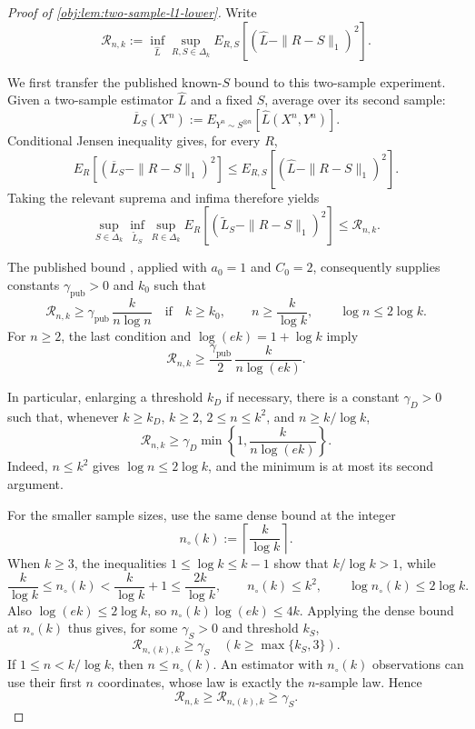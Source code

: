 \documentclass[11pt]{article}
\begin{document}
\begin{proof}[Proof of \cref{obj:lem:two-sample-l1-lower}]
Write
\[
\mathcal R_{n,k}:=
\inf_{\widehat L}\sup_{R,S\in\Delta_k}
E_{R,S}\!\left[(\widehat L-\|R-S\|_1)^2\right].
\] %

We first transfer the published known-\(S\) bound to this two-sample experiment. Given a two-sample estimator \(\widehat L\) and a fixed \(S\), average over its second sample:
\[
\overline L_S(X^n):=
E_{Y^n\sim S^{\otimes n}}\!\left[\widehat L(X^n,Y^n)\right].
\]
Conditional Jensen inequality gives, for every \(R\),
\[
E_R\!\left[(\overline L_S-\|R-S\|_1)^2\right]
\leq E_{R,S}\!\left[(\widehat L-\|R-S\|_1)^2\right].
\]
Taking the relevant suprema and infima therefore yields
\[
\sup_{S\in\Delta_k}\inf_{\widetilde L_S}\sup_{R\in\Delta_k}
E_R\!\left[(\widetilde L_S-\|R-S\|_1)^2\right]
\leq \mathcal R_{n,k}.
\] %

The published bound \citep[Theorem 3 and the unknown-both-distributions reduction following Theorem 6]{JiaoHanWeissman2018}, applied with \(a_0=1\) and \(C_0=2\), consequently supplies constants \(\gamma_{\mathrm{pub}}>0\) and \(k_0\) such that
\[
\mathcal R_{n,k}\geq \gamma_{\mathrm{pub}}\,\frac{k}{n\log n}
\quad\text{if}\quad
k\geq k_0,\qquad n\geq\frac{k}{\log k},
\qquad \log n\leq2\log k.
\]
For \(n\geq2\), the last condition and \(\log(ek)=1+\log k\) imply
\[
\mathcal R_{n,k}\geq
\frac{\gamma_{\mathrm{pub}}}{2}\,\frac{k}{n\log(ek)}.
\] %

In particular, enlarging a threshold \(k_D\) if necessary, there is a constant \(\gamma_D>0\) such that, whenever \(k\geq k_D\), \(k\geq2\), \(2\leq n\leq k^2\), and \(n\geq k/\log k\),
\[
\mathcal R_{n,k}\geq
\gamma_D\min\left\{1,\frac{k}{n\log(ek)}\right\}.
\]
Indeed, \(n\leq k^2\) gives \(\log n\leq2\log k\), and the minimum is at most its second argument. %

For the smaller sample sizes, use the same dense bound at the integer
\[
n_\circ(k):=\left\lceil\frac{k}{\log k}\right\rceil.
\]
When \(k\geq3\), the inequalities \(1\leq\log k\leq k-1\) show that \(k/\log k>1\), while
\[
\frac{k}{\log k}\leq n_\circ(k)
<\frac{k}{\log k}+1
\leq\frac{2k}{\log k},
\qquad
n_\circ(k)\leq k^2,
\qquad
\log n_\circ(k)\leq2\log k.
\]
Also \(\log(ek)\leq2\log k\), so \(n_\circ(k)\log(ek)\leq4k\). Applying the dense bound at \(n_\circ(k)\) thus gives, for some \(\gamma_S>0\) and threshold \(k_S\),
\[
\mathcal R_{n_\circ(k),k}\geq\gamma_S
\quad (k\geq\max\{k_S,3\}).
\]
If \(1\leq n<k/\log k\), then \(n\leq n_\circ(k)\). An estimator with \(n_\circ(k)\) observations can use their first \(n\) coordinates, whose law is exactly the \(n\)-sample law. Hence
\[
\mathcal R_{n,k}\geq\mathcal R_{n_\circ(k),k}
\geq\gamma_S.
\] %


\end{proof}
\end{document}
